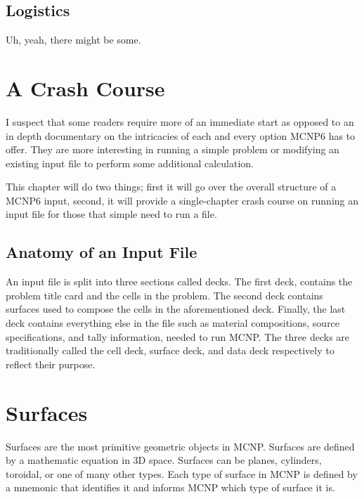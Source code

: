 \documentclass[10pt,a4paper]{book}
\begin{document}
\section{Logistics}

Uh, yeah, there might be some.

\chapter{A Crash Course}

I suspect that some readers require more of an immediate start as opposed to an in depth documentary on the intricacies of each and every option MCNP6 has to offer. They are more interesting in running a simple problem or modifying an existing input file to perform some additional calculation.

This chapter will do two things; first it will go over the overall structure of a MCNP6 input, second, it will provide a single-chapter crash course on running an input file for those that simple need to run a file.

\section{Anatomy of an Input File}

An input file is split into three sections called decks. The first deck, contains the problem title card and the cells in the problem. The second deck contains surfaces used to compose the cells in the aforementioned deck. Finally, the last deck contains everything else in the file such as material compositions, source specifications, and tally information, needed to run MCNP. The three decks are traditionally called the cell deck, surface deck, and data deck respectively to reflect their purpose.

\chapter{Surfaces}
Surfaces are the most primitive geometric objects in MCNP. Surfaces are defined by a mathematic equation in 3D space. Surfaces can be planes, cylinders, toroidal, or one of many other types. Each type of surface in MCNP is defined by a mnemonic that identifies it and informs MCNP which type of surface it is.
\end{document}
